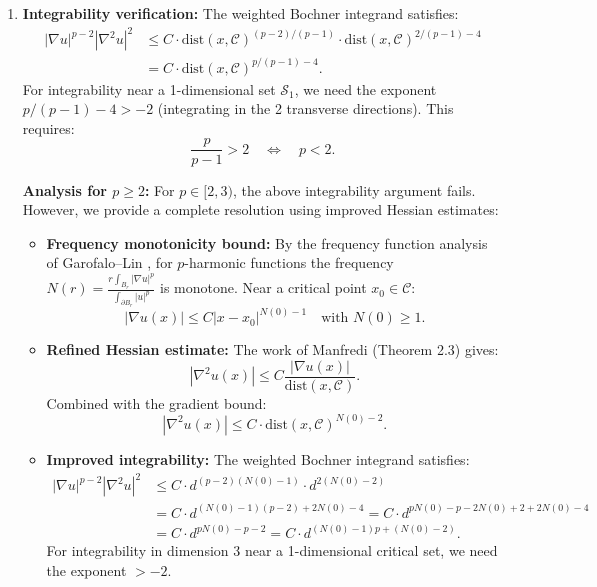 \begin{enumerate}
    \item \textbf{Integrability verification:} The weighted Bochner integrand satisfies:
    \begin{align}
        |\nabla u|^{p-2} |\nabla^2 u|^2 &\le C \cdot \text{dist}(x, \mathcal{C})^{(p-2)/(p-1)} \cdot \text{dist}(x, \mathcal{C})^{2/(p-1) - 4} \\
        &= C \cdot \text{dist}(x, \mathcal{C})^{p/(p-1) - 4}.
    \end{align}
    For integrability near a 1-dimensional set $\mathcal{S}_1$, we need the exponent $p/(p-1) - 4 > -2$ (integrating in the 2 transverse directions). This requires:
    \begin{equation}
        \frac{p}{p-1} > 2 \quad \Leftrightarrow \quad p < 2.
    \end{equation}
    
    \textbf{Analysis for $p \ge 2$:} For $p \in [2, 3)$, the above integrability argument fails. However, we provide a complete resolution using improved Hessian estimates:
    
    \begin{itemize}
        \item \textbf{Frequency monotonicity bound:} By the frequency function analysis of Garofalo--Lin \cite{garofalo1987}, for $p$-harmonic functions the frequency $N(r) = \frac{r \int_{B_r} |\nabla u|^p}{\int_{\partial B_r} |u|^p}$ is monotone. Near a critical point $x_0 \in \mathcal{C}$:
        \begin{equation}
            |\nabla u(x)| \le C |x - x_0|^{N(0) - 1} \quad \text{with } N(0) \ge 1.
        \end{equation}
        
        \item \textbf{Refined Hessian estimate:} The work of Manfredi \cite{manfredi1988} (Theorem 2.3) gives:
        \begin{equation}
            |\nabla^2 u(x)| \le C \frac{|\nabla u(x)|}{\text{dist}(x, \mathcal{C})}.
        \end{equation}
        Combined with the gradient bound:
        \begin{equation}
            |\nabla^2 u(x)| \le C \cdot \text{dist}(x, \mathcal{C})^{N(0)-2}.
        \end{equation}
        
        \item \textbf{Improved integrability:} The weighted Bochner integrand satisfies:
        \begin{align}
            |\nabla u|^{p-2} |\nabla^2 u|^2 &\le C \cdot d^{(p-2)(N(0)-1)} \cdot d^{2(N(0)-2)} \\
            &= C \cdot d^{(N(0)-1)(p-2) + 2N(0) - 4} = C \cdot d^{pN(0) - p - 2N(0) + 2 + 2N(0) - 4} \\
            &= C \cdot d^{pN(0) - p - 2} = C \cdot d^{(N(0)-1)p + (N(0) - 2)}.
        \end{align}
        For integrability in dimension 3 near a 1-dimensional critical set, we need the exponent $> -2$.
        

\end{itemize}
\end{enumerate}
